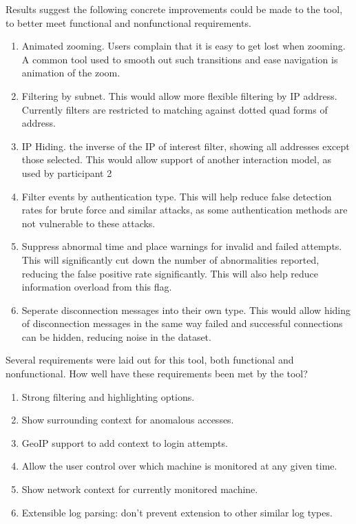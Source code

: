 Results suggest the following concrete improvements could be made to the tool, to better meet functional and nonfunctional requirements. 

\begin{enumerate}
\item{Animated zooming. Users complain that it is easy to get lost when zooming. A common tool used to smooth out such transitions and ease navigation is animation of the zoom.}
\item{Filtering by subnet. This would allow more flexible filtering by IP address. Currently filters are restricted to matching against dotted quad forms of address.}
\item{IP Hiding. the inverse of the IP of interest filter, showing all addresses except those selected. This would allow support of another interaction model, as used by participant 2}
\item{Filter events by authentication type. This will help reduce false detection rates for brute force and similar attacks, as some authentication methods are not vulnerable to these attacks.}
\item{Suppress abnormal time and place warnings for invalid and failed attempts. This will significantly cut down the number of abnormalities reported, reducing the false positive rate significantly. This will also help reduce information overload from this flag.}
\item{Seperate disconnection messages into their own type. This would allow hiding of disconnection messages in the same way failed and successful connections can be hidden, reducing noise in the dataset.}
\end{enumerate}

Several requirements were laid out for this tool, both functional and nonfunctional.
How well have these requirements been met by the tool?

\begin{enumerate}
\item{Strong filtering and highlighting options.}
\item{Show surrounding context for anomalous accesses.}
\item{GeoIP support to add context to login attempts.}
\item{Allow the user control over which machine is monitored at any given time.}
\item{Show network context for currently monitored machine.}
\item{Extensible log parsing: don't prevent extension to other similar log types.}
\end{enumerate}


